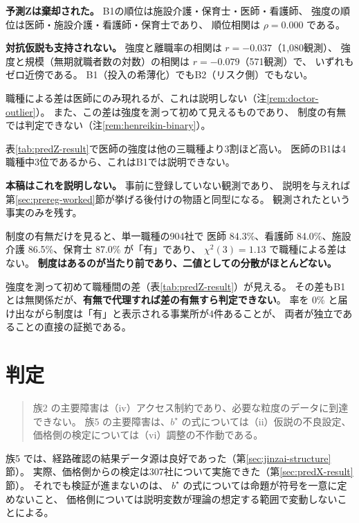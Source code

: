\textbf{予測Zは棄却された。} B1の順位は施設介護・保育士・医師・看護師、
強度の順位は医師・施設介護・看護師・保育士であり、
順位相関は $\rho=0.000$ である。

\textbf{対抗仮説も支持されない。} 強度と離職率の相関は $r=-0.037$（1{,}080観測）、
強度と規模（無期就職者数の対数）の相関は $r=-0.079$（571観測）で、
いずれもゼロ近傍である。
B1（投入の希薄化）でもB2（リスク側）でもない。

職種による差は医師にのみ現れるが、これは説明しない（注\ref{rem:doctor-outlier}）。
また、この差は強度を測って初めて見えるものであり、
制度の有無では判定できない（注\ref{rem:henreikin-binary}）。

\begin{remark}[医師だけが突出することの扱い]
\label{rem:doctor-outlier}
表\ref{tab:predZ-result}で医師の強度は他の三職種より3割ほど高い。
医師のB1は4職種中3位であるから、これはB1では説明できない。

\textbf{本稿はこれを説明しない。} 事前に登録していない観測であり、
説明を与えれば第\ref{sec:prereg-worked}節が挙げる後付けの物語と同型になる。
観測されたという事実のみを残す。
\end{remark}

\begin{remark}[有無は強度の代理にならない]
\label{rem:henreikin-binary}
制度の有無だけを見ると、単一職種の904社で
医師 84.3\%、看護師 84.0\%、施設介護 86.5\%、保育士 87.0\% が「有」であり、
$\chi^2(3)=1.13$ で職種による差はない。
\textbf{制度はあるのが当たり前であり、二値としての分散がほとんどない。}

強度を測って初めて職種間の差（表\ref{tab:predZ-result}）が見える。
その差もB1とは無関係だが、\textbf{有無で代理すれば差の有無すら判定できない}。
率を 0\% と届け出ながら制度は「有」と表示される事業所が4件あることが、
両者が独立であることの直接の証拠である。
\end{remark}

\section{判定}
\label{sec:family-assignment}

\begin{quote}
族2 の主要障害は（iv）アクセス制約であり、必要な粒度のデータに到達できない。
族5 の主要障害は、$b^\star$ の式については（ii）仮説の不良設定、
価格側の検定については（vi）調整の不作動である。
\end{quote}

族5 では、経路確認の結果データ源は良好であった（第\ref{sec:jinzai-structure}節）。
実際、価格側からの検定は307社について実施できた（第\ref{sec:predX-result}節）。
それでも検証が進まないのは、
$b^\star$ の式については命題が符号を一意に定めないこと、
価格側については説明変数が理論の想定する範囲で変動しないことによる。

